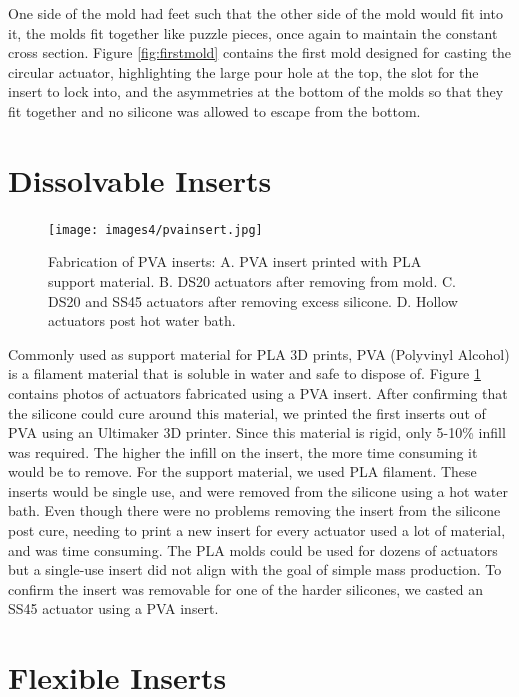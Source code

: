 One side of the mold had feet such that the other side of the mold would fit into it, the molds fit together like puzzle pieces, once again to maintain the constant cross section. Figure \ref{fig:firstmold} contains the first mold designed for casting the circular actuator, highlighting the large pour hole at the top, the slot for the insert to lock into, and the asymmetries at the bottom of the molds so that they fit together and no silicone was allowed to escape from the bottom. 

\section{Dissolvable Inserts}

\begin{figure}[h]
    \centering
    \texttt{[image: images4/pvainsert.jpg]}
    \caption{Fabrication of PVA inserts: A. PVA insert printed with PLA support material. B. DS20 actuators after removing from mold. C. DS20 and SS45 actuators after removing excess silicone. D. Hollow actuators post hot water bath.}
    \label{fig:pvainsert}
\end{figure}

Commonly used as support material for PLA 3D prints, PVA (Polyvinyl Alcohol) is a filament material that is soluble in water and safe to dispose of. Figure \ref{fig:pvainsert} contains photos of actuators fabricated using a PVA insert.  After confirming that the silicone could cure around this material, we printed the first inserts out of PVA using an Ultimaker 3D printer. Since this material is rigid, only 5-10\% infill was required. The higher the infill on the insert, the more time consuming it would be to remove. For the support material, we used PLA filament. These inserts would be single use, and were removed from the silicone using a hot water bath. Even though there were no problems removing the insert from the silicone post cure, needing to print a new insert for every actuator used a lot of material, and was time consuming. The PLA molds could be used for dozens of actuators but a single-use insert did not align with the goal of simple mass production. To confirm the insert was removable for one of the harder silicones, we casted an SS45 actuator using a PVA insert.  

\section{Flexible Inserts}

